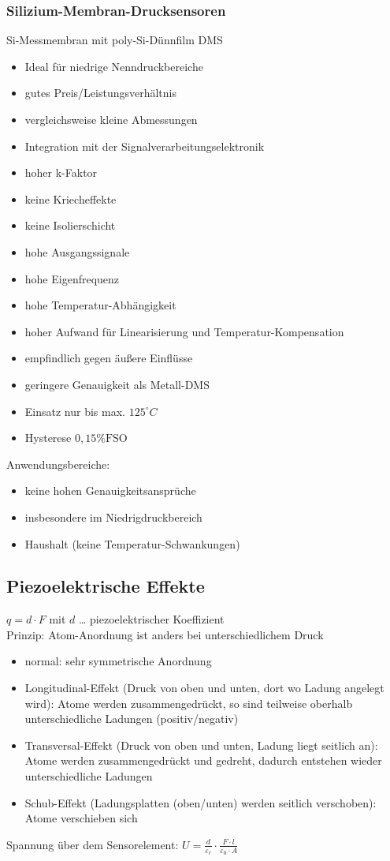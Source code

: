 \documentclass{scrreprt}
\begin{document}
\subsubsection{Silizium-Membran-Drucksensoren}
Si-Messmembran mit poly-Si-Dünnfilm DMS
\begin{itemize}[label=$+$]
\item Ideal für niedrige Nenndruckbereiche
\item gutes Preis/Leistungsverhältnis
\item vergleichsweise kleine Abmessungen
\item Integration mit der Signalverarbeitungselektronik
\item hoher k-Faktor
\item keine Kriecheffekte
\item keine Isolierschicht
\item hohe Ausgangssignale
\item hohe Eigenfrequenz
\end{itemize}
\begin{itemize}[label=$-$]
\item hohe Temperatur-Abhängigkeit
\item hoher Aufwand für Linearisierung und Temperatur-Kompensation
\item empfindlich gegen äußere Einflüsse
\item geringere Genauigkeit als Metall-DMS
\item Einsatz nur bis max. $125^\circ C$
\item Hysterese $0,15\% \mathrm{FSO}$
\end{itemize}
Anwendungsbereiche:
\begin{itemize}
\item keine hohen Genauigkeitsansprüche
\item insbesondere im Niedrigdruckbereich
\item Haushalt (keine Temperatur-Schwankungen)
\end{itemize}

\subsection{Piezoelektrische Effekte}
$q=d\cdot F$ mit $d$ … piezoelektrischer Koeffizient\\
Prinzip: Atom-Anordnung ist anders bei unterschiedlichem Druck
\begin{itemize}
\item normal: sehr symmetrische Anordnung
\item Longitudinal-Effekt (Druck von oben und unten, dort wo Ladung angelegt wird): Atome werden zusammengedrückt, so sind teilweise oberhalb unterschiedliche Ladungen (positiv/negativ)
\item Transversal-Effekt (Druck von oben und unten, Ladung liegt seitlich an): Atome werden zusammengedrückt und gedreht, dadurch entstehen wieder unterschiedliche Ladungen
\item Schub-Effekt (Ladungsplatten (oben/unten) werden seitlich verschoben): Atome verschieben sich
\end{itemize}
Spannung über dem Sensorelement: $U=\frac{d}{\varepsilon_r}\cdot \frac{F \cdot l}{\varepsilon_0 \cdot A}$
\end{document}
